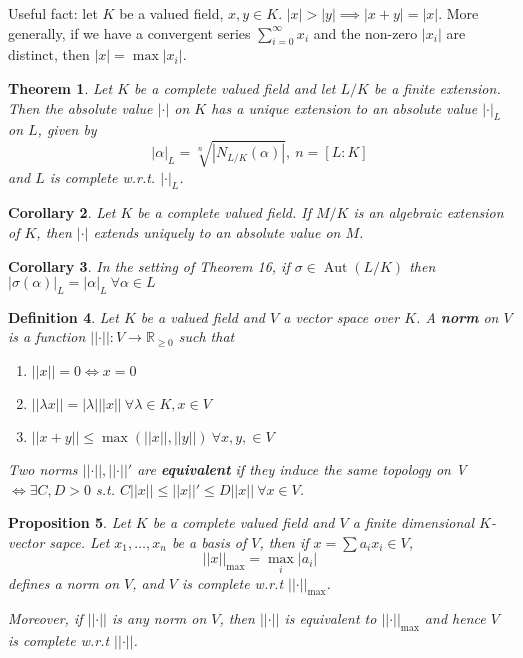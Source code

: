 \documentclass[a4paper]{article}
\newtheorem{definition}{Definition}
\newtheorem{theorem}[definition]{Theorem}
\newtheorem{prop}[definition]{Proposition}
\newtheorem{corollary}[definition]{Corollary}
\newcommand*\abs[1]{\left|#1\right|}
\newcommand*\norm[1]{\abs{\abs{#1}}}
\DeclareMathOperator{\Aut}{Aut}
\begin{document}
Useful fact: let $K$ be a valued field, $x, y \in K$. $\abs{x} > \abs{y} \implies \abs{x+y} = \abs{x}$. More generally, if we have a convergent series $\sum_{i=0}^\infty x_i$ and the non-zero $\abs{x_i}$ are distinct, then $\abs{x} = \max \abs{x_i}$.

\begin{theorem}
	Let $K$ be a complete valued field and let $L/K$ be a finite extension. Then the absolute value $\abs{\cdot}$ on $K$ has a unique extension to an absolute value $\abs{\cdot}_L$ on $L$, given by $$\abs{\alpha}_L = \sqrt[n]{\abs{N_{L/K}(\alpha)}},\ n=[L:K]$$ and $L$ is complete w.r.t. $\abs{\cdot}_L$. 
\end{theorem}

\begin{corollary}
	Let $K$ be a complete valued field. If $M/K$ is an algebraic extension of $K$, then $\abs{\cdot}$ extends uniquely to an absolute value on $M$.
\end{corollary}

\begin{corollary}
	In the setting of Theorem 16, if $\sigma \in \Aut(L/K)$ then $\abs{\sigma(\alpha)}_L = \abs{\alpha}_L\ \forall \alpha \in L$
\end{corollary}

\begin{definition}
	Let $K$ be a valued field and $V$ a vector space over $K$. A \textbf{norm} on $V$ is a function $\norm{\cdot}: V \to \mathbb{R}_{\geq 0}$ such that
	\begin{enumerate}[label=\roman*.]
		\item $\norm{x} = 0 \iff x = 0$
		\item $\norm{\lambda x} = \abs{\lambda}\norm{x}\ \forall \lambda \in K, x \in V$
		\item $\norm{x+y} \leq \max(\norm{x}, \norm{y})\ \forall x,y, \in V$
	\end{enumerate}
	Two norms $\norm{\cdot}, \norm{\cdot}'$ are \textbf{equivalent} if they induce the same topology on V $\iff \exists C,D > 0$ s.t. $C\norm{x} \leq \norm{x}' \leq D\norm{x}\ \forall x \in V$.
\end{definition}

\begin{prop}
	Let $K$ be a complete valued field and $V$ a finite dimensional $K$-vector sapce. Let $x_1, \dots, x_n$ be a basis of $V$, then if $x = \sum a_i x_i \in V$, $$\norm{x}_{\max} = \max_i \abs{a_i}$$ defines a norm on $V$, and $V$ is complete w.r.t $\norm{\cdot}_{\max}$.
	
	Moreover, if $\norm{\cdot}$ is any norm on $V$, then $\norm{\cdot}$ is equivalent to $\norm{\cdot}_{\max}$ and hence $V$ is complete w.r.t $\norm{\cdot}$.
\end{prop}
	
\end{document}
